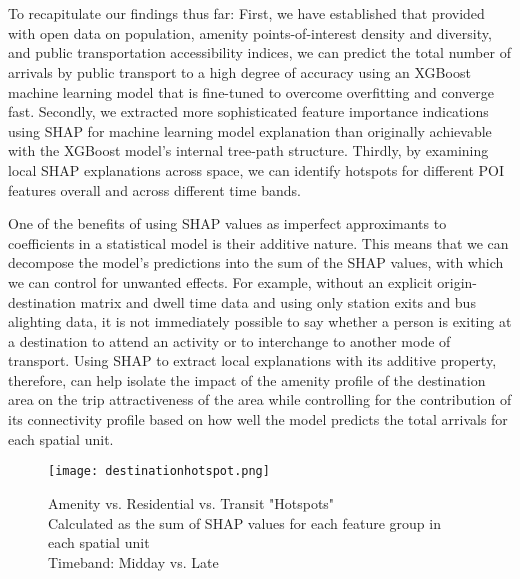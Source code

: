 \section*{}
To recapitulate our findings thus far: First, we have established that provided with open data on population, amenity points-of-interest density and diversity, and public transportation accessibility indices, we can predict the total number of arrivals by public transport to a high degree of accuracy using an XGBoost machine learning model that is fine-tuned to overcome overfitting and converge fast. Secondly, we extracted more sophisticated feature importance indications using SHAP for machine learning model explanation than originally achievable with the XGBoost model's internal tree-path structure. Thirdly, by examining local SHAP explanations across space, we can identify hotspots for different POI features overall and across different time bands. 

One of the benefits of using SHAP values as imperfect approximants to coefficients in a statistical model is their additive nature. This means that we can decompose the model's predictions into the sum of the SHAP values, with which we can control for unwanted effects. For example, without an explicit origin-destination matrix and dwell time data and using only station exits and bus alighting data, it is not immediately possible to say whether a person is exiting at a destination to attend an activity or to interchange to another mode of transport. Using SHAP to extract local explanations with its additive property, therefore, can help isolate the impact of the amenity profile of the destination area on the trip attractiveness of the area while controlling for the contribution of its connectivity profile based on how well the model predicts the total arrivals for each spatial unit.

\begin{figure}[!htb]
    \centering
    \texttt{[image: destinationhotspot.png]}
    \captionsetup{justification=centering}
    \caption{Amenity vs. Residential vs. Transit "Hotspots" \\Calculated as the sum of SHAP values for each feature group in each spatial unit\\Timeband: Midday vs. Late}
    \label{fig:destinationhotspot}
\end{figure}

